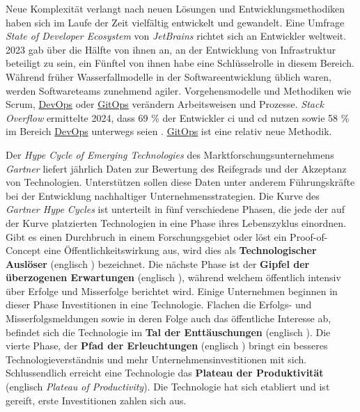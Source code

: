 Neue Komplexität verlangt nach neuen Lösungen und Entwicklungsmethodiken haben sich im Laufe der Zeit vielfältig entwickelt und gewandelt. Eine Umfrage \textit{State of Developer Ecosystem} von \textit{JetBrains} richtet sich an Entwickler weltweit. 2023 gab über die Hälfte von ihnen an, an der Entwicklung von Infrastruktur beteiligt zu sein, ein Fünftel von ihnen habe eine Schlüsselrolle in diesem Bereich. \cite{207:Developer-Ecosystem} Während früher Wasserfallmodelle in der Softwareentwicklung üblich waren, werden Softwareteams zunehmend agiler. Vorgehensmodelle und Methodiken wie Scrum, \hyperref[sec:03-01_introduction-to-devops]{DevOps} oder \hyperref[sec:03-03_gitops-as-further-evolution]{GitOps} verändern Arbeitsweisen und Prozesse. \textit{Stack Overflow} ermittelte 2024, dass 69 \% der Entwickler \gls{ci} und \gls{cd} nutzen sowie 58 \% im Bereich \hyperref[sec:03-01_introduction-to-devops]{DevOps} unterwegs seien \cite{206:Developer-Survey-2024}. \hyperref[sec:03-03_gitops-as-further-evolution]{GitOps} ist eine relativ neue Methodik.

Der \textit{Hype Cycle of Emerging Technologies} des Marktforschungsunternehmens \textit{Gartner} liefert jährlich Daten zur Bewertung des Reifegrads und der Akzeptanz von Technologien. Unterstützen sollen diese Daten unter anderem Führungskräfte bei der Entwicklung nachhaltiger Unternehmensstrategien. Die Kurve des \textit{Gartner Hype Cycles} ist unterteilt in fünf verschiedene Phasen, die jede der auf der Kurve platzierten Technologien in eine Phase ihres Lebenszyklus einordnen. Gibt es einen Durchbruch in einem Forschungsgebiet oder löst ein Proof-of-Concept eine Öffentlichkeitswirkung aus, wird dies als \textbf{Technologischer Auslöser} (englisch ) bezeichnet. Die nächste Phase ist der \textbf{Gipfel der überzogenen Erwartungen} (englisch ), während welchem öffentlich intensiv über Erfolge und Misserfolge berichtet wird. Einige Unternehmen beginnen in dieser Phase Investitionen in eine Technologie. Flachen die Erfolgs- und Misserfolgsmeldungen sowie in deren Folge auch das öffentliche Interesse ab, befindet sich die Technologie im \textbf{Tal der Enttäuschungen} (englisch ). Die vierte Phase, der \textbf{Pfad der Erleuchtungen} (englisch ) bringt ein besseres Technologieverständnis und mehr Unternehmensinvestitionen mit sich. Schlussendlich erreicht eine Technologie das \textbf{Plateau der Produktivität} (englisch \textit{Plateau of Productivity}). Die Technologie hat sich etabliert und ist gereift, erste Investitionen zahlen sich aus. \cite{108:Gartner-Hype-Cycle}

